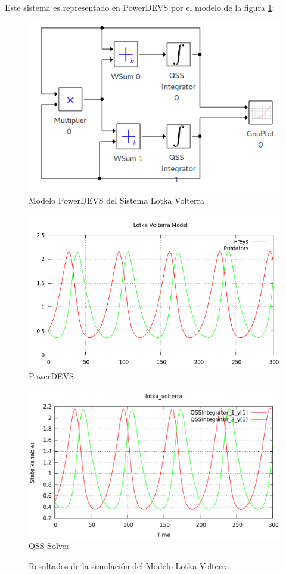 	Este sistema es representado en PowerDEVS por el modelo de la figura \ref{model:lotka_volterra}:

\begin{figure}[H]
\includegraphics[width=0.75\linewidth]{lotka_voltera_pwd}
\caption{Modelo PowerDEVS del Sistema Lotka Volterra}
\label{model:lotka_volterra}
\end{figure}

\begin{figure}[H]
\centering
\begin{minipage}{0.5\textwidth}
\centering
 \includegraphics[width=\linewidth]{lotka_voltera-pd}
PowerDEVS \\
\end{minipage}\hfill
\begin{minipage}{0.5\textwidth}
\centering
 \includegraphics[width=\linewidth]{lotka_voltera-qss}
QSS-Solver \\
\end{minipage}
\label{graph:lotka_voltera}
\caption{Resultados de la simulación del Modelo Lotka Volterra}
\end{figure}

